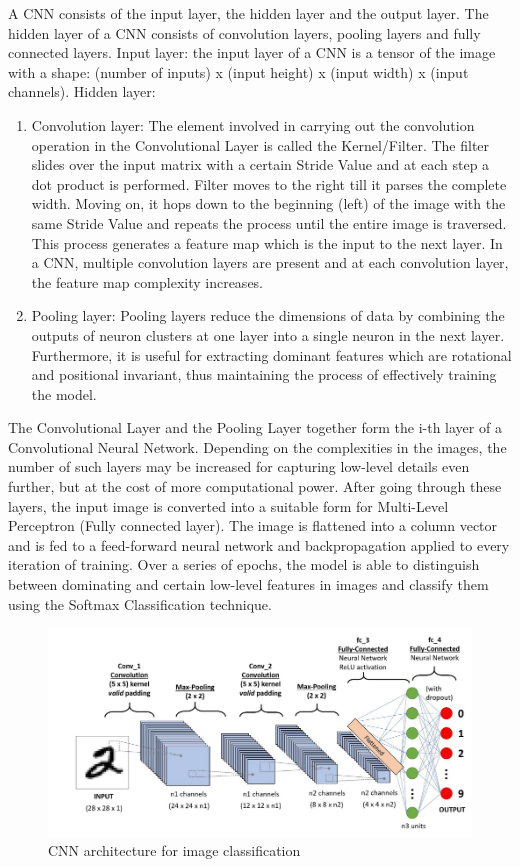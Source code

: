     A CNN consists of the input layer, the hidden layer and the output layer. The hidden layer of a CNN consists of convolution layers, pooling layers and fully connected layers. 
    Input layer: the input layer of a CNN is a tensor of the image with a shape: (number of inputs) x (input height) x (input width) x (input channels).
    Hidden layer: 
    \begin{enumerate}
    	\item Convolution layer: The element involved in carrying out the convolution operation in the Convolutional Layer is called the Kernel/Filter. The filter slides over the input matrix with a certain Stride Value and at each step a dot product is performed. Filter moves to the right till it parses the complete width. Moving on, it hops down to the beginning (left) of the image with the same Stride Value and repeats the process until the entire image is traversed. This process generates a feature map which is the input to the next layer. In a CNN, multiple convolution layers are present and at each convolution layer, the feature map complexity increases. 
    	\item Pooling layer: Pooling layers reduce the dimensions of data by combining the outputs of neuron clusters at one layer into a single neuron in the next layer. Furthermore, it is useful for extracting dominant features which are rotational and positional invariant, thus maintaining the process of effectively training the model. 
    \end{enumerate}
       
    The Convolutional Layer and the Pooling Layer together form the i-th layer of a Convolutional Neural Network. Depending on the complexities in the images, the number of such layers may be increased for capturing low-level details even further, but at the cost of more computational power. 
    After going through these layers, the input image is converted into a suitable form for Multi-Level Perceptron (Fully connected layer). The image is flattened into a column vector and  is fed to a feed-forward neural network and backpropagation applied to every iteration of training. Over a series of epochs, the model is able to distinguish between dominating and certain low-level features in images and classify them using the Softmax Classification technique.
      \begin{figure}[h]
      	\centering
      	\includegraphics[width=1\linewidth]{images/cnn.png}
      	\caption{CNN architecture for image classification \cite{imgcnn}}
      	\label{l00}	
      \end{figure}
    
